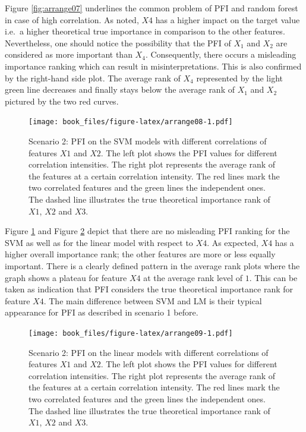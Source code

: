 \documentclass[]{krantz}
\begin{document}
Figure \ref{fig:arrange07} underlines the common problem of PFI and
random forest in case of high correlation. As noted, \(X4\) has a higher
impact on the target value i.e.~a higher theoretical true importance in
comparison to the other features. Nevertheless, one should notice the
possibility that the PFI of \(X_1\) and \(X_2\) are considered as more
important than \(X_4\). Consequently, there occurs a misleading
importance ranking which can result in misinterpretations. This is also
confirmed by the right-hand side plot. The average rank of \(X_4\)
represented by the light green line decreases and finally stays below
the average rank of \(X_1\) and \(X_2\) pictured by the two red curves.

\begin{figure}
\centering
\texttt{[image: book\_files/figure-latex/arrange08-1.pdf]}
\caption{\label{fig:arrange08}Scenario 2: PFI on the SVM models with
different correlations of features \(X1\) and \(X2\). The left plot
shows the PFI values for different correlation intensities. The right
plot represents the average rank of the features at a certain
correlation intensity. The red lines mark the two correlated features
and the green lines the independent ones. The dashed line illustrates
the true theoretical importance rank of \(X1\), \(X2\) and \(X3\).}
\end{figure}

Figure \ref{fig:arrange08} and Figure \ref{fig:arrange09} depict that
there are no misleading PFI ranking for the SVM as well as for the
linear model with respect to \(X4\). As expected, \(X4\) has a higher
overall importance rank; the other features are more or less equally
important. There is a clearly defined pattern in the average rank plots
where the graph shows a plateau for feature \(X4\) at the average rank
level of \(1\). This can be taken as indication that PFI considers the
true theoretical importance rank for feature \(X4\). The main difference
between SVM and LM is their typical appearance for PFI as described in
scenario 1 before.

\begin{figure}
\centering
\texttt{[image: book\_files/figure-latex/arrange09-1.pdf]}
\caption{\label{fig:arrange09}Scenario 2: PFI on the linear models with
different correlations of features \(X1\) and \(X2\). The left plot
shows the PFI values for different correlation intensities. The right
plot represents the average rank of the features at a certain
correlation intensity. The red lines mark the two correlated features
and the green lines the independent ones. The dashed line illustrates
the true theoretical importance rank of \(X1\), \(X2\) and \(X3\).}
\end{figure}
\end{document}
